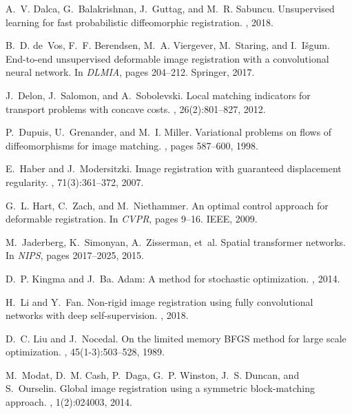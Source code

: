 \documentclass{article}
\numberwithin{equation}{section}
\begin{document}
{\begin{thebibliography}{10}
A.~V. Dalca, G.~Balakrishnan, J.~Guttag, and M.~R. Sabuncu.
\newblock Unsupervised learning for fast probabilistic diffeomorphic
  registration.
, 2018.

B.~D. de~Vos, F.~F. Berendsen, M.~A. Viergever, M.~Staring, and I.~I{\v{s}}gum.
\newblock End-to-end unsupervised deformable image registration with a
  convolutional neural network.
\newblock In {\em DLMIA}, pages 204--212. Springer, 2017.

J.~Delon, J.~Salomon, and A.~Sobolevski.
\newblock Local matching indicators for transport problems with concave costs.
, 26(2):801--827, 2012.

P.~Dupuis, U.~Grenander, and M.~I. Miller.
\newblock Variational problems on flows of diffeomorphisms for image matching.
, pages 587--600, 1998.

E.~Haber and J.~Modersitzki.
\newblock Image registration with guaranteed displacement regularity.
, 71(3):361--372, 2007.

G.~L. Hart, C.~Zach, and M.~Niethammer.
\newblock An optimal control approach for deformable registration.
\newblock In {\em CVPR}, pages 9--16. IEEE, 2009.

M.~Jaderberg, K.~Simonyan, A.~Zisserman, et~al.
\newblock Spatial transformer networks.
\newblock In {\em NIPS}, pages 2017--2025, 2015.

D.~P. Kingma and J.~Ba.
\newblock Adam: A method for stochastic optimization.
, 2014.

H.~Li and Y.~Fan.
\newblock Non-rigid image registration using fully convolutional networks with
  deep self-supervision.
, 2018.

D.~C. Liu and J.~Nocedal.
\newblock On the limited memory {BFGS} method for large scale optimization.
, 45(1-3):503--528, 1989.

M.~Modat, D.~M. Cash, P.~Daga, G.~P. Winston, J.~S. Duncan, and S.~Ourselin.
\newblock Global image registration using a symmetric block-matching approach.
, 1(2):024003, 2014.


\end{thebibliography}}
\end{document}
